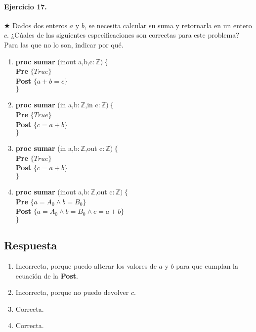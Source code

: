 \documentclass[a4paper]{article}
\begin{document}
\paragraph*{Ejercicio 17.} $\bigstar$ Dados dos enteros $a$ y $b$, se necesita calcular su suma y retornarla en un entero $c$. ¿Cúales de las siguientes especificaciones son correctas para este problema? Para las que no lo son, indicar por qué. 
	\begin{enumerate}[label=\alph*)]
		\item
			\textbf{proc sumar }(inout a,b,c$: \mathbb{Z})\ \{$\smallskip \\
			\hspace*{6mm} \textbf{Pre }$\{True\}$\smallskip \\
			\hspace*{6mm} \textbf{Post }$\{a+b=c\}$\\
			$\}$
		\item
			\textbf{proc sumar }(in a,b$: \mathbb{Z}$,in c$: \mathbb{Z})\ \{$\smallskip \\
			\hspace*{6mm} \textbf{Pre }$\{ True\}$\smallskip \\
			\hspace*{6mm} \textbf{Post }$\{c=a+b\}$\\
			$\}$
		\item
			\textbf{proc sumar }(in a,b$: \mathbb{Z}$,out c$: \mathbb{Z})\ \{$\smallskip \\
			\hspace*{6mm} \textbf{Pre }$\{ True\}$\smallskip \\
			\hspace*{6mm} \textbf{Post }$\{c=a+b\}$\\
			$\}$
		\item
			\textbf{proc sumar }(inout a,b$: \mathbb{Z}$,out c$: \mathbb{Z})\ \{$\smallskip \\
			\hspace*{6mm} \textbf{Pre }$\{ a=A_0\wedge b=B_0\}$\smallskip \\
			\hspace*{6mm} \textbf{Post }$\{ a=A_0\wedge b=B_0\wedge c=a+b\}$\\
			$\}$
	\end{enumerate}
\subsection*{Respuesta}
	\begin{enumerate}[label=\alph*)]
		\item Incorrecta, porque puedo alterar los valores de $a$ y $b$ para 
			que cumplan la ecuación de la \textbf{Post}.
		\item Incorrecta, porque no puedo devolver $c$.
		\item Correcta.
		\item Correcta.
	\end{enumerate}
	
\end{document}
